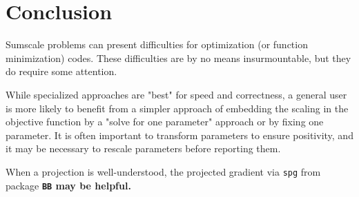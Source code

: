 \documentclass[11pt]{article}\usepackage[]{graphicx}\usepackage[]{color}
\newcommand{\code}[1]{{\tt#1}}
\newcommand{\pkg}[1]{\bf{\tt#1}\rm }
\begin{document}
\section{Conclusion}

Sumscale problems can present difficulties for optimization (or function minimization)
codes. These difficulties are by no means insurmountable, but they do require some 
attention.

While specialized approaches are "best" for speed and correctness, a general user is more
likely to benefit from a simpler approach of embedding the scaling in the objective function
by a "solve for one parameter" approach or by fixing one parameter. It is often important
to transform parameters to ensure positivity, and it may be necessary to rescale 
parameters before reporting them. 

When a projection is well-understood, the projected
gradient via \code{spg} from package \pkg{BB} may be helpful.




\end{document}
